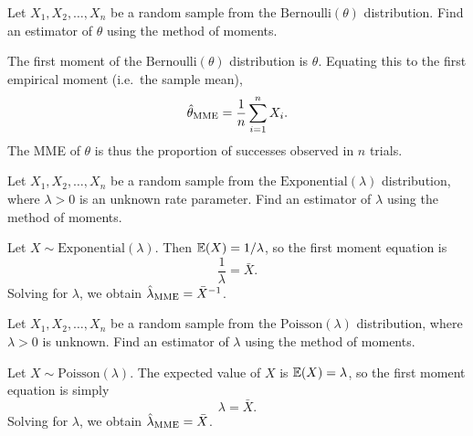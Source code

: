\begin{exercise}
\begin{questions}

\question
Let $X_1,X_2,\ldots,X_n$ be a random sample from the $\text{Bernoulli}(\theta)$ distribution. Find an estimator of $\theta$ using the method of moments.
\begin{answer}
The first moment of the $\text{Bernoulli}(\theta)$ distribution is $\theta$. 
Equating this to the first empirical moment (i.e.\ the sample mean), 
\[
\hat{\theta}_{\text{\scriptsize{MME}}} = \frac{1}{n}\sum_{i=1}^n X_i.
\]
The MME of $\theta$ is thus the proportion of successes observed in $n$ trials.
\end{answer}

\question
Let $X_1,X_2,\ldots,X_n$ be a random sample from the $\text{Exponential}(\lambda)$ distribution, where $\lambda>0$ is an unknown rate parameter. Find an estimator of $\lambda$ using the method of moments. 
\begin{answer}
Let $X\sim\text{Exponential}(\lambda)$. Then $\mathbb{E}(X) = 1/\lambda$, so the first moment equation is 
\[
\frac{1}{\lambda} = \bar{X}.
\]
Solving for $\lambda$, we obtain $\hat{\lambda}_{\text{\scriptsize{MME}}} = \bar{X}^{-1}$.
\end{answer}

\question
Let $X_1,X_2,\ldots,X_n$ be a random sample from the $\text{Poisson}(\lambda)$ distribution, where $\lambda>0$ is unknown. Find an estimator of $\lambda$ using the method of moments.
\begin{answer}
Let $X\sim\text{Poisson}(\lambda)$. The expected value of $X$ is $\mathbb{E}(X)=\lambda$, so the first moment equation is simply 
\[
\lambda = \bar{X}.
\]
Solving for $\lambda$, we obtain $\hat{\lambda}_{\text{\scriptsize{MME}}} = \bar{X}$.
\end{answer}
\end{questions}
\end{exercise}

